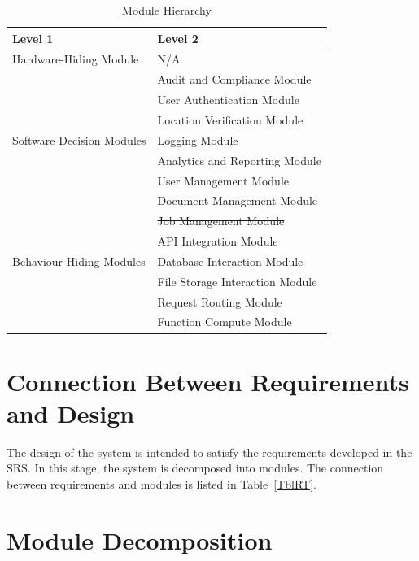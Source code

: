 \documentclass[12pt, titlepage]{article}
\begin{document}
\begin{table}[h!]
  \centering
  \begin{tabular}{p{} p{}}
    \toprule
    \textbf{Level 1}                                       &
    \textbf{Level 2}
    \\
    \midrule

    {Hardware-Hiding Module}                               & N/A
    \\
    \midrule

    \multirow{7}{0.3\textwidth}{Software Decision Modules} & Audit
    and Compliance Module
    \\
    & User Authentication Module      \\
    & Location Verification Module    \\
    & Logging Module                  \\
    & Analytics and Reporting Module  \\
    & User Management Module          \\
    & Document Management Module      \\
    & \sout{Job Management Module}           \\
    \midrule

    \multirow{3}{0.3\textwidth}{Behaviour-Hiding Modules}  & {API
    Integration Module}
    \\
    & Database Interaction Module     \\
    & File Storage Interaction Module \\
    & Request Routing Module          \\
    & Function Compute Module         \\
    \bottomrule
  \end{tabular}
  \caption{Module Hierarchy}
  \label{TblMH}
\end{table}

\section{Connection Between Requirements and Design} \label{SecConnection}

The design of the system is intended to satisfy the requirements
developed in the SRS. In this stage, the system is decomposed into
modules. The connection between requirements and modules is listed
in Table~\ref{TblRT}.

\section{Module Decomposition} \label{SecMD}
\end{document}

